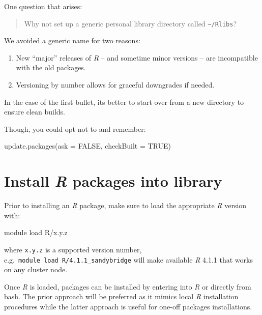 \documentclass[
  letterpaper,
  DIV=11,
  numbers=noendperiod]{scrreport}
\newenvironment{Shaded}{\begin{snugshade}}{\end{snugshade}}
\newcommand{\AttributeTok}[1]{\textcolor[rgb]{0.40,0.45,0.13}{#1}}
\newcommand{\ConstantTok}[1]{\textcolor[rgb]{0.56,0.35,0.01}{#1}}
\newcommand{\FunctionTok}[1]{\textcolor[rgb]{0.28,0.35,0.67}{#1}}
\newcommand{\NormalTok}[1]{\textcolor[rgb]{0.00,0.23,0.31}{#1}}
\newcommand{\SpecialCharTok}[1]{\textcolor[rgb]{0.37,0.37,0.37}{#1}}
\providecommand{\tightlist}{%
  \setlength{\itemsep}{0pt}\setlength{\parskip}{0pt}}\usepackage{longtable,booktabs,array}
\begin{document}
One question that arises:

\begin{quote}
Why not set up a generic personal library directory called
\texttt{\textasciitilde{}/Rlibs}?
\end{quote}

We avoided a generic name for two reasons:

\begin{enumerate}
\def\labelenumi{\arabic{enumi}.}
\tightlist
\item
  New ``major'' releases of \emph{R} -- and sometime minor versions --
  are incompatible with the old packages.
\item
  Versioning by number allows for graceful downgrades if needed.
\end{enumerate}

In the case of the first bullet, its better to start over from a new
directory to ensure clean builds.

Though, you could opt not to and remember:

\begin{Shaded}
\begin{Highlighting}[]
\FunctionTok{update.packages}\NormalTok{(}\AttributeTok{ask =} \ConstantTok{FALSE}\NormalTok{, }\AttributeTok{checkBuilt =} \ConstantTok{TRUE}\NormalTok{)}
\end{Highlighting}
\end{Shaded}

\hypertarget{install-r-packages-into-library}{%
\section{\texorpdfstring{Install \emph{R} packages into
library}{Install R packages into library}}\label{install-r-packages-into-library}}

Prior to installing an \emph{R} package, make sure to load the
appropriate \emph{R} version with:

\begin{Shaded}
\begin{Highlighting}[]
\NormalTok{module load R}\SpecialCharTok{/}\NormalTok{x.y.z}
\end{Highlighting}
\end{Shaded}

where \texttt{x.y.z} is a supported version number,
e.g.~\texttt{module\ load\ R/4.1.1\_sandybridge} will make available
\emph{R} 4.1.1 that works on any cluster node.

Once \emph{R} is loaded, packages can be installed by entering into
\emph{R} or directly from bash. The prior approach will be preferred as
it mimics local \emph{R} installation procedures while the latter
approach is useful for one-off packages installations.
\end{document}
